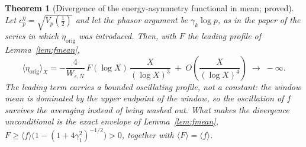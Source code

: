 \documentclass[11pt]{article}
\newtheorem{theorem}{Theorem}[section]
\newcommand{\WeN}{W_{\varepsilon,N}}
\begin{document}
\begin{theorem}[Divergence of the energy-asymmetry functional in mean; proved]
\label{thm:eta}
Let $c_p^{\eta}=\sqrt{V_p(\tfrac12)}$ and let the phasor argument be
$\gamma_k\log p$, as in the paper of the series in which
$\eta_{\mathrm{orig}}$ was introduced. Then, with $F$ the leading profile of
Lemma~\ref{lem:fmean},
\[
\langle\eta_{\mathrm{orig}}\rangle_X
=-\frac{4}{\WeN}\,F(\log X)\,\frac{X}{(\log X)^3}
\;+\;O\!\left(\frac{X}{(\log X)^4}\right)
\;\longrightarrow\;-\infty .
\]
The leading term carries a bounded oscillating profile, not a constant: the
window mean is dominated by the upper endpoint of the window, so the
oscillation of $f$ survives the averaging instead of being washed out. What
makes the divergence unconditional is the exact envelope of
Lemma~\ref{lem:fmean},
$F\ge\langle f\rangle\bigl(1-(1+4\gamma_1^2)^{-1/2}\bigr)>0$, together with
$\langle F\rangle=\langle f\rangle$.
\end{theorem}
\end{document}

